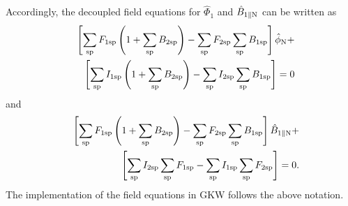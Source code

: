 Accordingly, the decoupled field equations for $\hat{\Phi}_1$ and $\hat{B}_{1 \parallel \mathrm{N}}$ can be written as
\begin{eqnarray}
	&& \left[ \sum_{\mathrm{sp}} F_{1 \mathrm{sp}} \left(1 + \sum_{\mathrm{sp}} B_{2 \mathrm{sp}} \right) - \sum_{\mathrm{sp}} F_{2 \mathrm{sp}} \sum_{\mathrm{sp}} B_{1 \mathrm{sp}} \right] \hat{\phi}_{\mathrm{N}} + \nonumber \\
	&& \left[ \sum_{\mathrm{sp}} I_{1 \mathrm{sp}} \left(1 + \sum_{\mathrm{sp}} B_{2 \mathrm{sp}} \right) - \sum_{\mathrm{sp}} I_{2 \mathrm{sp}} \sum_{\mathrm{sp}} B_{1 \mathrm{sp}} \right] = 0
	\label{eq:poisson-dec}
\end{eqnarray}
and
\begin{eqnarray}
	&& \left[ \sum_{\mathrm{sp}} F_{1 \mathrm{sp}} \left(1 + \sum_{\mathrm{sp}} B_{2 \mathrm{sp}} \right) - \sum_{\mathrm{sp}} F_{2 \mathrm{sp}} \sum_{\mathrm{sp}} B_{1 \mathrm{sp}} \right] \hat{B}_{1 \parallel \mathrm{N}} + \nonumber \\
	&& \left[ \sum_{\mathrm{sp}} I_{2 \mathrm{sp}} \sum_{\mathrm{sp}} F_{1 \mathrm{sp}} - \sum_{\mathrm{sp}} I_{1 \mathrm{sp}} \sum_{\mathrm{sp}} F_{2 \mathrm{sp}} \right] = 0.
	\label{eq:bpar-dec}
\end{eqnarray}
The implementation of the field equations in GKW follows the above notation. 


